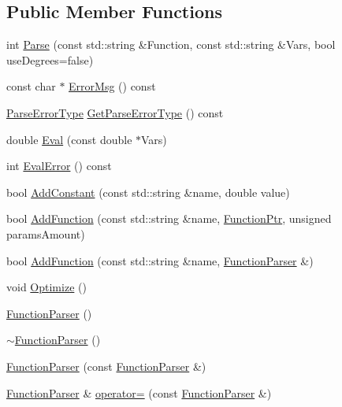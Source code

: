 \subsection*{Public Member Functions}
\begin{DoxyCompactItemize}
\item 
int \hyperlink{class_function_parser_af4e0b209ec9771dcd76e27f3fcad1b51}{Parse} (const std\+::string \&Function, const std\+::string \&Vars, bool use\+Degrees=false)
\item 
const char $\ast$ \hyperlink{class_function_parser_a000e3edaf5dc8ee121df03b731ff0192}{Error\+Msg} () const
\item 
\hyperlink{class_function_parser_a0bb74d288d02ba86367cc1c85351c8e7}{Parse\+Error\+Type} \hyperlink{class_function_parser_ad6ddf1546278fa7148c968374e6a097a}{Get\+Parse\+Error\+Type} () const
\item 
double \hyperlink{class_function_parser_a8fe3538f4cd207346c390059ba334023}{Eval} (const double $\ast$Vars)
\item 
int \hyperlink{class_function_parser_a94faf9f4616d0850821cce15abbcf421}{Eval\+Error} () const
\item 
bool \hyperlink{class_function_parser_a481976b6eb58b15d31d4f3700d9ad730}{Add\+Constant} (const std\+::string \&name, double value)
\item 
bool \hyperlink{class_function_parser_a8d477dd0041ca594dac795bba24c9f3a}{Add\+Function} (const std\+::string \&name, \hyperlink{class_function_parser_acca53651fb8f1c7a44e3d2cac7e62455}{Function\+Ptr}, unsigned params\+Amount)
\item 
bool \hyperlink{class_function_parser_a7d6c6465658e9831d0c51e3bd6b5a4c0}{Add\+Function} (const std\+::string \&name, \hyperlink{class_function_parser}{Function\+Parser} \&)
\item 
void \hyperlink{class_function_parser_a5466523ee5198fb4b38461b362b1481d}{Optimize} ()
\item 
\hyperlink{class_function_parser_a18468eeb56ac5c1b1a6a0b0cebb2c045}{Function\+Parser} ()
\item 
\hyperlink{class_function_parser_a50257dda6ec4f2c4adf6740e31cf7da7}{$\sim$\+Function\+Parser} ()
\item 
\hyperlink{class_function_parser_adcfa2c887c17019c29fdbfaa39ab28fb}{Function\+Parser} (const \hyperlink{class_function_parser}{Function\+Parser} \&)
\item 
\hyperlink{class_function_parser}{Function\+Parser} \& \hyperlink{class_function_parser_a316870fce14d0b1d9bc386f23115cc53}{operator=} (const \hyperlink{class_function_parser}{Function\+Parser} \&)
\end{DoxyCompactItemize}
